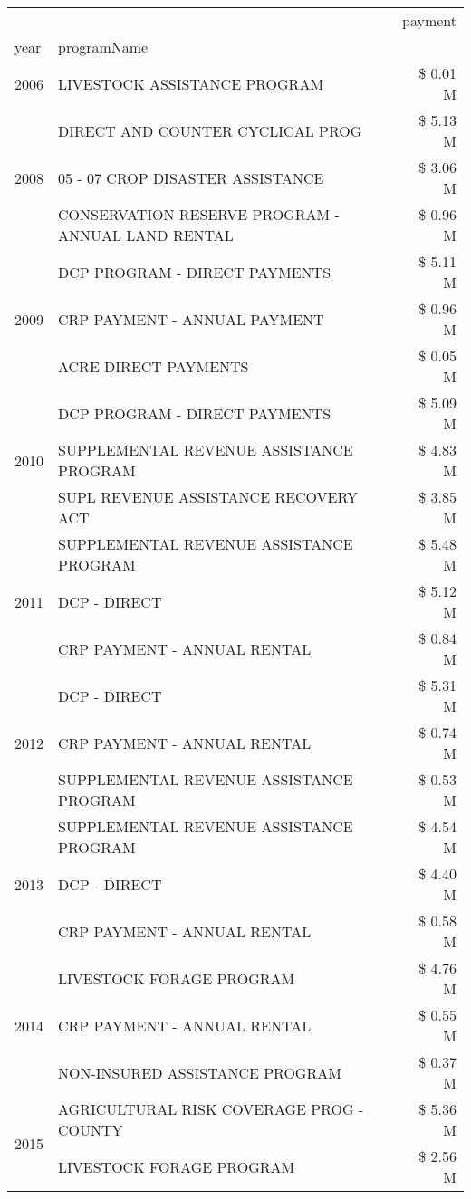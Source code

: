 \begin{tabular}{llr}
\toprule
 &  & payment \\
year & programName &  \\
\midrule
2006 & LIVESTOCK ASSISTANCE PROGRAM & \$ 0.01 M \\
\cline{1-3}
\multirow[t]{3}{*}{2008} & DIRECT AND COUNTER CYCLICAL PROG & \$ 5.13 M \\
 & 05 - 07 CROP DISASTER ASSISTANCE & \$ 3.06 M \\
 & CONSERVATION RESERVE PROGRAM - ANNUAL LAND RENTAL & \$ 0.96 M \\
\cline{1-3}
\multirow[t]{3}{*}{2009} & DCP PROGRAM - DIRECT PAYMENTS & \$ 5.11 M \\
 & CRP PAYMENT - ANNUAL PAYMENT & \$ 0.96 M \\
 & ACRE DIRECT PAYMENTS & \$ 0.05 M \\
\cline{1-3}
\multirow[t]{3}{*}{2010} & DCP PROGRAM - DIRECT PAYMENTS & \$ 5.09 M \\
 & SUPPLEMENTAL REVENUE ASSISTANCE PROGRAM & \$ 4.83 M \\
 & SUPL REVENUE ASSISTANCE RECOVERY ACT & \$ 3.85 M \\
\cline{1-3}
\multirow[t]{3}{*}{2011} & SUPPLEMENTAL REVENUE ASSISTANCE PROGRAM & \$ 5.48 M \\
 & DCP - DIRECT & \$ 5.12 M \\
 & CRP PAYMENT - ANNUAL RENTAL & \$ 0.84 M \\
\cline{1-3}
\multirow[t]{3}{*}{2012} & DCP - DIRECT & \$ 5.31 M \\
 & CRP PAYMENT - ANNUAL RENTAL & \$ 0.74 M \\
 & SUPPLEMENTAL REVENUE ASSISTANCE PROGRAM & \$ 0.53 M \\
\cline{1-3}
\multirow[t]{3}{*}{2013} & SUPPLEMENTAL REVENUE ASSISTANCE PROGRAM & \$ 4.54 M \\
 & DCP - DIRECT & \$ 4.40 M \\
 & CRP PAYMENT - ANNUAL RENTAL & \$ 0.58 M \\
\cline{1-3}
\multirow[t]{3}{*}{2014} & LIVESTOCK FORAGE PROGRAM & \$ 4.76 M \\
 & CRP PAYMENT - ANNUAL RENTAL & \$ 0.55 M \\
 & NON-INSURED ASSISTANCE PROGRAM & \$ 0.37 M \\
\cline{1-3}
\multirow[t]{3}{*}{2015} & AGRICULTURAL RISK COVERAGE PROG - COUNTY & \$ 5.36 M \\
 & LIVESTOCK FORAGE PROGRAM & \$ 2.56 M \\

\end{tabular}
